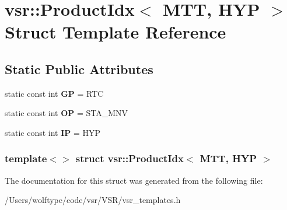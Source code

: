 \hypertarget{structvsr_1_1_product_idx_3_01_m_t_t_00_01_h_y_p_01_4}{\section{vsr\-:\-:Product\-Idx$<$ M\-T\-T, H\-Y\-P $>$ Struct Template Reference}
\label{structvsr_1_1_product_idx_3_01_m_t_t_00_01_h_y_p_01_4}
}
\subsection*{Static Public Attributes}
\begin{DoxyCompactItemize}
\item 
\hypertarget{structvsr_1_1_product_idx_3_01_m_t_t_00_01_h_y_p_01_4_a7f2f70dac07d3ba68650c6a8fc4956d9}{static const int {\bfseries G\-P} = R\-T\-C}\label{structvsr_1_1_product_idx_3_01_m_t_t_00_01_h_y_p_01_4_a7f2f70dac07d3ba68650c6a8fc4956d9}

\item 
\hypertarget{structvsr_1_1_product_idx_3_01_m_t_t_00_01_h_y_p_01_4_aae6ecb05e1a82b5c34b2a5904947ccc3}{static const int {\bfseries O\-P} = S\-T\-A\-\_\-\-M\-N\-V}\label{structvsr_1_1_product_idx_3_01_m_t_t_00_01_h_y_p_01_4_aae6ecb05e1a82b5c34b2a5904947ccc3}

\item 
\hypertarget{structvsr_1_1_product_idx_3_01_m_t_t_00_01_h_y_p_01_4_a0c7897b2d88a3b772f2a2581f592a307}{static const int {\bfseries I\-P} = H\-Y\-P}\label{structvsr_1_1_product_idx_3_01_m_t_t_00_01_h_y_p_01_4_a0c7897b2d88a3b772f2a2581f592a307}

\end{DoxyCompactItemize}
\subsubsection*{template$<$$>$ struct vsr\-::\-Product\-Idx$<$ M\-T\-T, H\-Y\-P $>$}



The documentation for this struct was generated from the following file\-:\begin{DoxyCompactItemize}
\item 
/\-Users/wolftype/code/vsr/\-V\-S\-R/vsr\-\_\-templates.\-h\end{DoxyCompactItemize}
